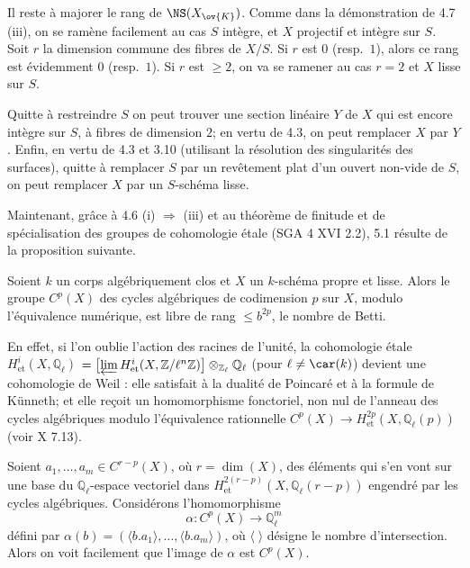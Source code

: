 Il reste \`a majorer le rang de $\NS(X_{\ov{K}})$. Comme dans la d\'emonstration de 4.7 (iii), on se ram\`ene facilement au cas $S$ int\`egre, et $X$ projectif et int\`egre sur $S$. Soit $r$ la dimension commune des fibres de $X/S$. Si $r$ est $0$ (resp.\ $1$), alors ce rang est \'evidemment $0$ (resp.\ $1$). Si $r$ est $\geq 2$, on va se ramener au cas $r = 2$ et $X$ lisse sur $S$.

Quitte \`a restreindre $S$ on peut trouver une section lin\'eaire $Y$ de $X$ qui est encore int\`egre sur $S$, \`a fibres de dimension $2$; en vertu de 4.3, on peut remplacer $X$ par $Y$. Enfin, en vertu de 4.3 et 3.10 (utilisant la r\'esolution des singularit\'es des surfaces), quitte \`a remplacer $S$ par un rev\^etement plat d'un ouvert non-vide de $S$, on peut remplacer $X$ par un $S$-sch\'ema lisse.

Maintenant, gr\^ace \`a 4.6 (i) $\Rightarrow$ (iii) et au th\'eor\`eme de finitude et de sp\'ecialisation des groupes de cohomologie \'etale (SGA 4 XVI 2.2), 5.1 r\'esulte de la proposition suivante.

\begin{proposition}[5.2]
Soient $k$ un corps alg\'ebriquement clos et $X$ un $k$-sch\'ema propre et lisse. Alors le groupe $C^p(X)$ des cycles alg\'ebriques de codimension $p$ sur $X$, modulo l'\'equivalence num\'erique, est libre de rang $\leq b^{2p}$, le nombre de Betti.
\end{proposition}

En effet, si l'on oublie l'action des racines de l'unit\'e, la cohomologie \'etale $H^i_{\mathrm{et}}(X, \mathbb{Q}_\ell)$ $= \bigl[\varprojlim H^i_{\mathrm{et}}(X, \mathbb{Z}/\ell^n\mathbb{Z})\bigr] \otimes_{\mathbb{Z}_\ell} \mathbb{Q}_\ell$ (pour $\ell \neq \car(k)$) devient une cohomologie de Weil : elle satisfait \`a la dualit\'e de Poincar\'e et \`a la formule de K\"unneth; et elle re\c{c}oit un homomorphisme fonctoriel, non nul de l'anneau des cycles alg\'ebriques modulo l'\'equivalence rationnelle $C^p(X) \to H^{2p}_{\mathrm{et}}(X, \mathbb{Q}_\ell(p))$ (voir X 7.13).

Soient $a_1, \dots, a_m \in C^{r-p}(X)$, o\`u $r = \dim(X)$, des \'el\'ements qui s'en vont sur une base du $\mathbb{Q}_\ell$-espace vectoriel dans $H^{2(r-p)}_{\mathrm{et}}(X, \mathbb{Q}_\ell(r-p))$ engendr\'e par les cycles alg\'ebriques. Consid\'erons l'homomorphisme
\[
\alpha : C^p(X) \to \mathbb{Q}_\ell^m
\]
d\'efini par $\alpha(b) = (\langle b.a_1 \rangle, \dots, \langle b.a_m \rangle)$, o\`u $\langle \; \rangle$ d\'esigne le nombre d'intersection. Alors on voit facilement que l'image de $\alpha$ est $C^p(X)$.

